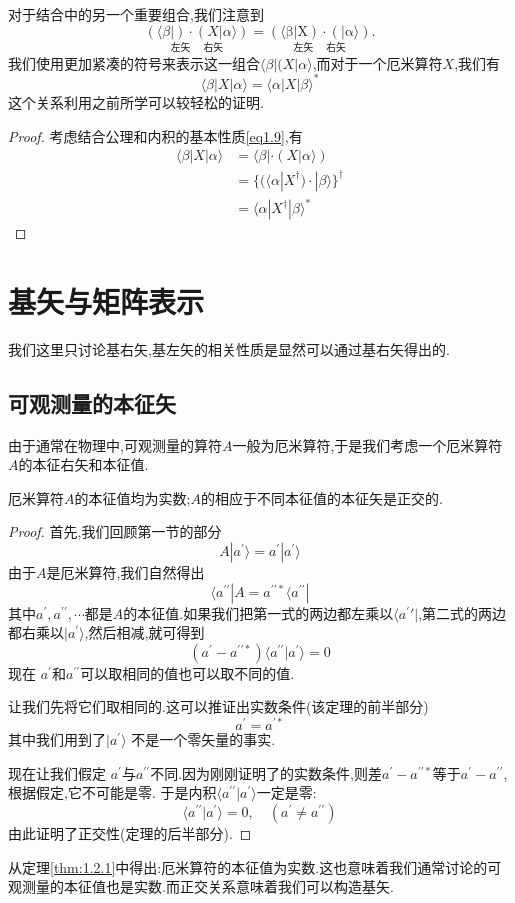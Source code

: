 \documentclass[lang=cn,newtx,10pt,scheme=chinese,thmcnt=section]{elegantbook}
\begin{document}
对于结合中的另一个重要组合,我们注意到
$$ \underset{\text{左矢}\quad\text{  右矢}}{(\langle\beta|)\cdot(X|\alpha\rangle)}=\underset{\text{左矢}\quad\text{ 右矢}}{\operatorname*{(\langle\beta|X)\cdot(|\alpha\rangle)}}.$$
我们使用更加紧凑的符号来表示这一组合$\langle\beta|(X|\alpha\rangle$,而对于一个厄米算符$X$,我们有
\begin{equation}
\langle\beta|X|\alpha\rangle=\langle\alpha|X|\beta\rangle^*
\end{equation}
这个关系利用之前所学可以较轻松的证明.
\begin{proof}
	考虑结合公理和内积的基本性质\ref{eq1.9},有
	$$
	\begin{aligned}
		\langle\beta|X|\alpha\rangle & =\langle\beta|\cdot(X|\alpha\rangle) \\
		&=\{(\langle\alpha| X^\dagger)\cdot|\beta\rangle\}^\dagger \\
		&=\langle\alpha| X^\dagger|\beta\rangle^*
	\end{aligned}
	$$
\end{proof}
\section{基矢与矩阵表示}
我们这里只讨论基右矢,基左矢的相关性质是显然可以通过基右矢得出的.
\subsection*{可观测量的本征矢}
由于通常在物理中,可观测量的算符$A$一般为厄米算符,于是我们考虑一个厄米算符$A$的本征右矢和本征值.

\begin{theorem}\label{thm:1.2.1}
	厄米算符$A$的本征值均为实数;$A$的相应于不同本征值的本征矢是正交的.
\end{theorem}
\begin{proof}
	首先,我们回顾第一节的部分
	$$
	A|a^{\prime}\rangle=a^{\prime}| a^{\prime}\rangle
	$$
	由于$A$是厄米算符,我们自然得出
	$$
		\langle a^{\prime\prime}|A=a^{\prime\prime*}\langle a^{\prime\prime}|
	$$
	其中$a^\prime,a^{\prime\prime},\cdots$都是$A$的本征值.如果我们把第一式的两边都左乘以$\langle a^\prime\prime|$,第二式的两边都右乘以$|a^\prime\rangle$,然后相减,就可得到
	$$(a^{\prime}-a^{\prime\prime*})\langle a^{\prime\prime}|a^{\prime}\rangle=0$$
	现在 $a^{\prime}$和$a^{\prime\prime}$可以取相同的值也可以取不同的值.
	
	让我们先将它们取相同的.这可以推证出实数条件(该定理的前半部分)
	$$a^{\prime}=a^{\prime*}$$
	其中我们用到了$|a^\prime\rangle$ 不是一个零矢量的事实. 
	
	现在让我们假定 $a^\prime$与$a^{\prime\prime}$不同.因为刚刚证明了的实数条件,则差$a^{\prime}-a^{\prime\prime*}$等于$a^{\prime}-a^{\prime\prime}$,根据假定,它不可能是零. 于是内积$\langle a^{\prime\prime}|a^{\prime}\rangle$一定是零:
	$$\langle a^{\prime\prime}| a^{\prime}\rangle=0,\quad(a^{\prime}\neq a^{\prime\prime})$$
	由此证明了正交性(定理的后半部分).
\end{proof}
从定理\ref{thm:1.2.1}中得出:厄米算符的本征值为实数.这也意味着我们通常讨论的可观测量的本征值也是实数.而正交关系意味着我们可以构造基矢.
\end{document}
